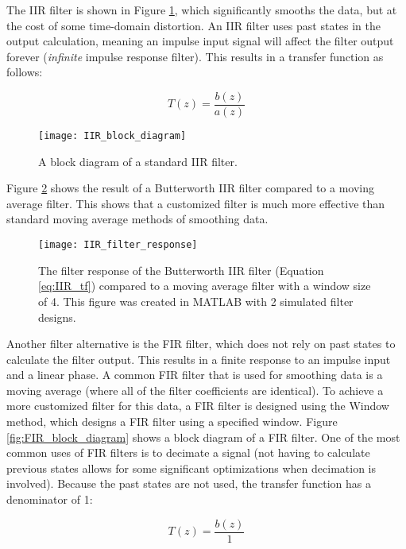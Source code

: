 The IIR filter is shown in Figure \ref{fig:IIR_block_diagram}, which significantly smooths the data, but at the cost of some time-domain distortion.  An IIR filter uses past states in the output calculation, meaning an impulse input signal will affect the filter output forever (\textit{infinite} impulse response filter).  This results in a transfer function as follows:

\begin{equation} \label{eq:IIR_tf}
	T(z) = \frac{b(z)}{a(z)}
\end{equation}

\begin{figure}
	\centering
	\texttt{[image: IIR\_block\_diagram]}
	\decoRule
	\caption{A block diagram of a standard IIR filter. \cite{wiki:IIR_block_diagram}}
	\label{fig:IIR_block_diagram}
\end{figure}


Figure \ref{fig:IIR_filter_response} shows the result of a Butterworth IIR filter compared to a moving average filter.  This shows that a customized filter is much more effective than standard moving average methods of smoothing data.

\begin{figure}
	\centering
	\texttt{[image: IIR\_filter\_response]}
	\decoRule
	\caption{The filter response of the Butterworth IIR filter (Equation \ref{eq:IIR_tf}) compared to a moving average filter with a window size of 4.  This figure was created in MATLAB with 2 simulated filter designs.}
	\label{fig:IIR_filter_response}
\end{figure}


Another filter alternative is the FIR filter, which does not rely on past states to calculate the filter output.  This results in a finite response to an impulse input and a linear phase.  A common FIR filter that is used for smoothing data is a moving average (where all of the filter coefficients are identical).  To achieve a more customized filter for this data, a FIR filter is designed using the Window method, which designs a FIR filter using a specified window.  Figure \ref{fig:FIR_block_diagram} shows a block diagram of a FIR filter.  One of the most common uses of FIR filters is to decimate a signal (not having to calculate previous states allows for some significant optimizations when decimation is involved).  Because the past states are not used, the transfer function has a denominator of 1:

\begin{equation}
	T(z) = \frac{b(z)}{1}
\end{equation}

